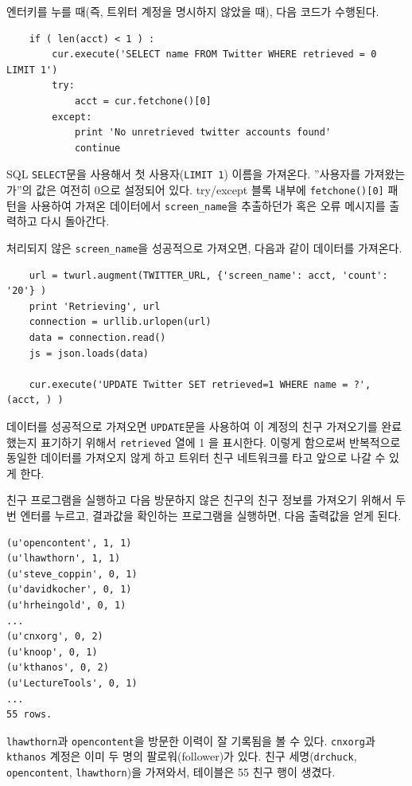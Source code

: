 엔터키를 누를 때(즉, 트위터 계정을 명시하지 않았을 때), 다음 코드가 수행된다.

\beforeverb
\begin{verbatim}
    if ( len(acct) < 1 ) :
        cur.execute('SELECT name FROM Twitter WHERE retrieved = 0 LIMIT 1')
        try:
            acct = cur.fetchone()[0]
        except:
            print 'No unretrieved twitter accounts found'
            continue
\end{verbatim}
\afterverb
%

SQL {\tt SELECT}문을 사용해서 첫 사용자({\tt LIMIT 1}) 이름을 가져온다.
''사용자를 가져왔는가''의 값은 여전히 0으로 설정되어 있다.
try/except 블록 내부에 {\tt fetchone()[0]} 패턴을 사용하여 가져온 데이터에서 \verb"screen_name"을 
추출하던가 혹은 오류 메시지를 출력하고 다시 돌아간다.

처리되지 않은 \verb"screen_name"을 성공적으로 가져오면, 다음과 같이 데이터를 가져온다.

\beforeverb
\begin{verbatim}
    url = twurl.augment(TWITTER_URL, {'screen_name': acct, 'count': '20'} )
    print 'Retrieving', url
    connection = urllib.urlopen(url)
    data = connection.read()
    js = json.loads(data)

    cur.execute('UPDATE Twitter SET retrieved=1 WHERE name = ?', (acct, ) )
\end{verbatim}
\afterverb
%

데이터를 성공적으로 가져오면 {\tt UPDATE}문을 사용하여 이 계정의 친구 가져오기를 완료했는지 표기하기 위해서 {\tt retrieved} 열에 1 을 표시한다.
이렇게 함으로써 반복적으로 동일한 데이터를 가져오지 않게 하고 트위터 친구 네트워크를 타고 앞으로 나갈 수 있게 한다.

친구 프로그램을 실행하고 다음 방문하지 않은 친구의 친구 정보를 가져오기 위해서
두번 엔터를 누르고, 결과값을 확인하는 프로그램을 실행하면, 다음 출력값을 얻게 된다.

\beforeverb
\begin{verbatim}
(u'opencontent', 1, 1)
(u'lhawthorn', 1, 1)
(u'steve_coppin', 0, 1)
(u'davidkocher', 0, 1)
(u'hrheingold', 0, 1)
...
(u'cnxorg', 0, 2)
(u'knoop', 0, 1)
(u'kthanos', 0, 2)
(u'LectureTools', 0, 1)
...
55 rows.
\end{verbatim}
\afterverb
%

{\tt lhawthorn}과 {\tt opencontent}을 방문한 이력이 잘 기록됨을 볼 수 있다.
{\tt cnxorg}과 {\tt kthanos} 계정은 이미 두 명의 팔로워(follower)가 있다.
친구 세명({\tt drchuck}, {\tt opencontent}, {\tt lhawthorn})을 가져와서, 테이블은 55 친구 행이 생겼다.

